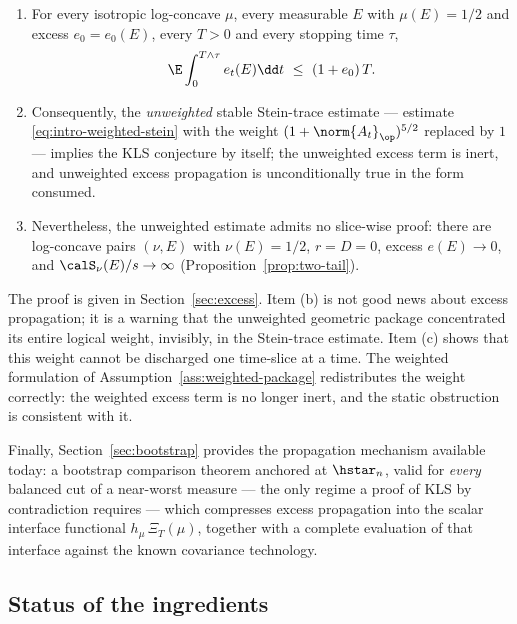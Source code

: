 \documentclass[../../main.tex]{subfiles}
\begin{document}
\begin{proposition}
\label{prop:intro-audit}
\leavevmode
\begin{enumerate}[label=(\alph*),leftmargin=2.2em]
\item For every isotropic log-concave $\mu$, every measurable $E$ with $\mu(E)=1/2$ and excess
$e_0=e_0(E)$, every $T>0$ and every stopping time $\tau$,
\[
  \E\int_0^{T\wedge\tau}e_t(E)\dd t\ \le\ (1+e_0)\,T .
\]
\item Consequently, the \emph{unweighted} stable Stein-trace estimate --- estimate
\eqref{eq:intro-weighted-stein} with the weight $(1+\norm{A_t}_\op)^{5/2}$ replaced by $1$ ---
implies the KLS conjecture by itself; the unweighted excess term is inert, and unweighted excess
propagation is unconditionally true in the form consumed.
\item Nevertheless, the unweighted estimate admits no slice-wise proof: there are log-concave
pairs $(\nu,E)$ with $\nu(E)=1/2$, $r=D=0$, excess $e(E)\to0$, and $\calS_\nu(E)/s\to\infty$
(Proposition~\ref{prop:two-tail}).
\end{enumerate}
\end{proposition}

The proof is given in Section~\ref{sec:excess}. Item (b) is not good news about excess
propagation; it is a warning that the unweighted geometric package concentrated its entire
logical weight, invisibly, in the Stein-trace estimate. Item (c) shows that this weight cannot be
discharged one time-slice at a time. The weighted formulation of
Assumption~\ref{ass:weighted-package} redistributes the weight correctly: the weighted excess term
is no longer inert, and the static obstruction is consistent with it.

Finally, Section~\ref{sec:bootstrap} provides the propagation mechanism available today: a
bootstrap comparison theorem anchored at $\hstar_n$, valid for \emph{every} balanced cut of a
near-worst measure --- the only regime a proof of KLS by contradiction requires --- which
compresses excess propagation into the scalar interface functional $h_\mu\,\Xi_T(\mu)$, together
with a complete evaluation of that interface against the known covariance technology.

\subsection{Status of the ingredients}
\end{document}
